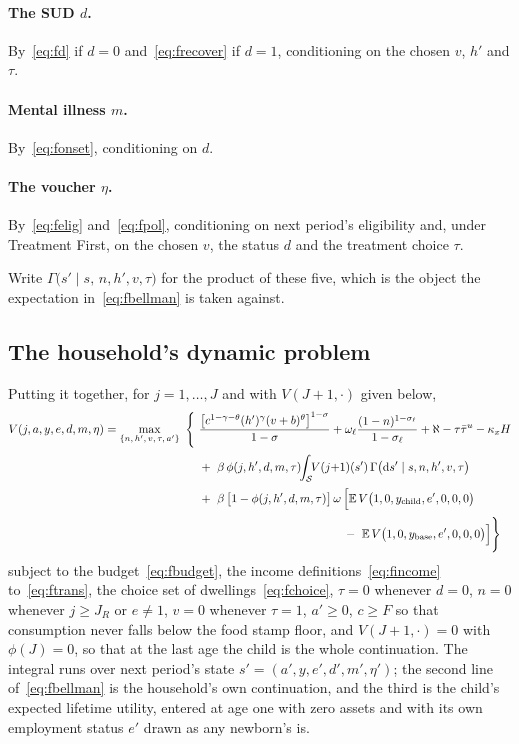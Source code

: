 \documentclass[10pt]{article}
\begin{document}
\paragraph{The SUD $d$.} By~\eqref{eq:fd} if $d=0$ and~\eqref{eq:frecover}
if $d=1$, conditioning on the chosen $v$, $h'$ and $\tau$.

\paragraph{Mental illness $m$.} By~\eqref{eq:fonset}, conditioning on $d$.

\paragraph{The voucher $\eta$.} By~\eqref{eq:felig} and~\eqref{eq:fpol},
conditioning on next period's eligibility and, under Treatment First, on the
chosen $v$, the status $d$ and the treatment choice $\tau$.

Write $\Gamma\big(s'\mid s,\,n,h',v,\tau\big)$ for the product of these five,
which is the object the expectation in~\eqref{eq:fbellman} is taken against.

\subsection{The household's dynamic problem}\label{sec:fproblem}

Putting it together, for $j=1,\dots,J$ and with $V(J{+}1,\cdot)$ given below,
\begin{equation}\label{eq:fbellman}
\begin{aligned}
V(j,a,y,e,d,m,\eta)=\max_{\{n,\,h',\,v,\,\tau,\,a'\}}\ \Bigg\{\
&\frac{\big[c^{1-\gamma-\theta}(h')^{\gamma}(v+b)^{\theta}\big]^{1-\sigma}}{1-\sigma}
+\omega_{\ell}\frac{(1-n)^{1-\sigma_{\ell}}}{1-\sigma_{\ell}}
+\aleph-\tau\bar\tau^{u}-\kappa_x H\\[2pt]
&+\ \beta\,\phi(j,h',d,m,\tau)\!\!\int_{\mathcal S}\!\! V(j{+}1)(s')\,
\Gamma\big(\mathrm{d}s'\mid s,n,h',v,\tau\big)\\[2pt]
&+\ \beta\,\big[1-\phi(j,h',d,m,\tau)\big]\,\omega\,
\Big[\mathbb{E}\,V\big(1,0,y_{\text{child}},e',0,0,0\big)\\[2pt]
&\hphantom{+\ \beta\,\big[1-\phi(j,h',d,m,\tau)\big]\,\omega\,\Big[}
-\ \mathbb{E}\,V\big(1,0,y_{\text{base}},e',0,0,0\big)\Big]\Bigg\}
\end{aligned}
\end{equation}
subject to the budget~\eqref{eq:fbudget}, the income
definitions~\eqref{eq:fincome} to~\eqref{eq:ftrans}, the choice
set of dwellings~\eqref{eq:fchoice}, $\tau=0$ whenever $d=0$, $n=0$
whenever $j\ge J_R$ or
$e\neq1$, $v=0$ whenever $\tau=1$, $a'\ge0$, $c\ge F$ so that
consumption never falls below the food stamp floor, and $V(J{+}1,\cdot)=0$
with $\phi(J)=0$, so that at the last age the
child is the whole continuation. The integral runs over next period's
state $s'=(a',y,e',d',m',\eta')$; the second line of~\eqref{eq:fbellman} is the
household's own continuation, and the third is the child's expected lifetime
utility, entered at age one with zero assets and with its own employment status
$e'$ drawn as any newborn's is.
\end{document}
